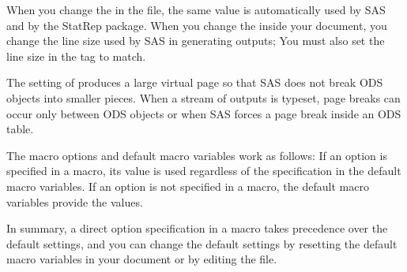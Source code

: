 \documentclass[article,oneside]{memoir}
\newcommand*{\StatRep}{\textsf{StatRep}\xspace}
\begin{document}
  When you change the  in the  file, the same value
  is automatically used by SAS and by the \StatRep package.
  When you change the  inside your document,
  you change the line size used by SAS in generating
  outputs; You must also set the line size in the  tag to match.

  The setting of  produces a large
  virtual page so that SAS does not break ODS objects into smaller pieces.
  When a stream of outputs is typeset, page breaks can occur only between ODS objects or
  when SAS forces a page break inside an ODS table.

  The macro options and default macro variables work as follows:
  If an option is specified in a macro, its value is used regardless of
  the specification in the default macro variables.
  If an option is not specified in a macro, the default macro variables provide
  the values.

  In summary, a direct option specification in a macro takes precedence over the default
  settings, and you can change the default settings by resetting the
  default macro variables
  in your document or by editing the  file.
\end{document}
